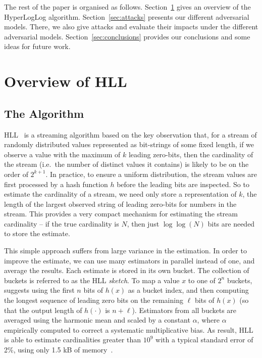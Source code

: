 \documentclass{IEEEtran}
\begin{document}
The rest of the paper is organised as follows. Section~\ref{sec:overview} gives an overview of the HyperLogLog algorithm. Section~\ref{sec:attacks} presents our different adversarial models. There, we also give attacks and evaluate their impacts under the different adversarial models. Section~\ref{sec:conclusions} provides our conclusions and some ideas for future work.


 
\section{Overview of HLL}\label{sec:overview}
\subsection{The Algorithm}
HLL~\cite{loglog,hll2} is a streaming algorithm based on the key observation that, for a stream of randomly distributed values represented as bit-strings of some fixed length, if we observe a value with the maximum of $k$ leading zero-bits, then the cardinality of the stream (i.e.\ the number of distinct values it contains) is likely to be on the order of $2^{k+1}$. In practice, to ensure a uniform distribution, the stream values are first processed by a hash function $h$ before the leading bits are inspected. So to estimate the cardinality of a stream, we need only store a representation of $k$, the length of the largest observed string of leading zero-bits for numbers in the stream. This provides a very compact mechanism for estimating the stream cardinality -- if the true cardinality is $N$, then just $\log\log(N)$ bits are needed to store the estimate. 

This simple approach suffers from large variance in the estimation. In order to improve the estimate, we can use many estimators in parallel instead of one, and average the results. Each estimate is stored in its own bucket. The collection of buckets is referred to as the HLL \emph{sketch}. To map a value $x$ to one of $2^n$ buckets, \cite{loglog} suggests using the first $n$ bits of $h(x)$ as a bucket index, and then computing the longest sequence of leading zero bits on the remaining $\ell$ bits of $h(x)$ (so that the output length of $h(\cdot)$ is $n+\ell$). Estimators from all buckets are averaged using the harmonic mean and scaled by a constant $\alpha$, where $\alpha$ empirically computed to correct a systematic multiplicative bias. As result, HLL is able to estimate cardinalities greater than $10^9$ with a typical standard error of 2\%, using only 1.5 kB of memory~\cite{add-ref-for-this-claim}.
\end{document}

